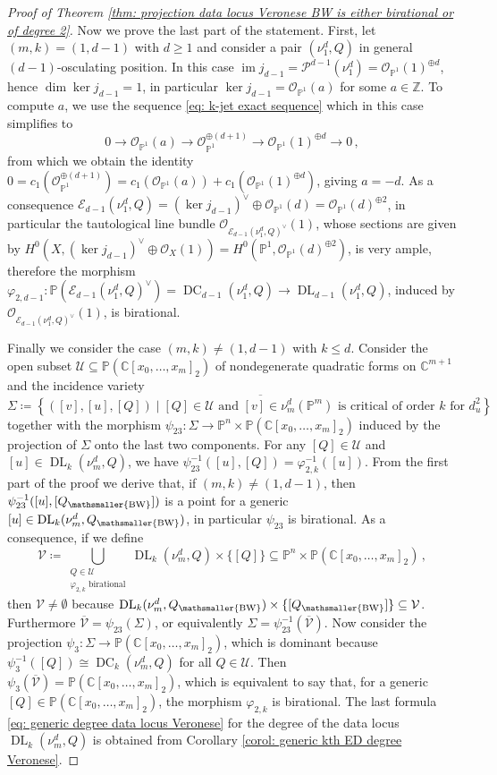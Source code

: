 \documentclass[11pt,reqno]{amsart}
\numberwithin{equation}{section}
\theoremstyle{plain}
\numberwithin{theorem}{section}
\theoremstyle{definition}
\renewcommand{\P}{\mathbb{P}}
\newcommand{\Z}{\mathbb{Z}}
\newcommand{\C}{\mathbb{C}}
\newcommand{\EE}{\mathcal{E}}
\newcommand{\OO}{\mathcal{O}}
\newcommand{\PP}{\mathcal{P}}
\newcommand{\DC}{\operatorname{DC}}
\newcommand{\DL}{\operatorname{DL}}
\newcommand{\image}{\operatorname{im}}
\newcommand{\mBW}{\mathsmaller{\mathrm{BW}}}
\begin{document}
\begin{proof}[Proof of Theorem \ref{thm: projection data locus Veronese BW is either birational or of degree 2}]
Now we prove the last part of the statement. First, let $(m,k)=(1,d-1)$ with $d\ge 1$ and consider a pair $(\nu_1^d,Q)$ in general $(d-1)$-osculating position. In this case $\image j_{d-1}=\PP^{d-1}(\nu_1^d)=\OO_{\P^1}(1)^{\oplus d}$, hence $\dim\ker j_{d-1}=1$, in particular $\ker j_{d-1}=\OO_{\P^1}(a)$ for some $a\in\Z$. To compute $a$, we use the sequence \eqref{eq: k-jet exact sequence} which in this case simplifies to
\[
0 \to \OO_{\P^1}(a) \to \OO_{\P^1}^{\oplus(d+1)} \to \OO_{\P^1}(1)^{\oplus d} \to 0\,,
\]
from which we obtain the identity $0=c_1(\OO_{\P^1}^{\oplus(d+1)})=c_1(\OO_{\P^1}(a))+c_1(\OO_{\P^1}(1)^{\oplus d})$, giving $a=-d$. As a consequence $\EE_{d-1}(\nu_1^d,Q)=(\ker j_{d-1})^\vee\oplus\OO_{\P^1}(d)=\OO_{\P^1}(d)^{\oplus 2}$, in particular the tautological line bundle $\OO_{\EE_{d-1}(\nu_1^d,Q)^\vee}(1)$, whose sections are given by $H^0(X,(\ker j_{d-1})^\vee\oplus \OO_X(1))=H^0(\P^1,\OO_{\P^1}(d)^{\oplus 2})$, is very ample, therefore the morphism $\varphi_{2,d-1}\colon\P(\EE_{d-1}(\nu_1^d,Q)^\vee)=\DC_{d-1}(\nu_1^d,Q)\to\DL_{d-1}(\nu_1^d,Q)$, induced by $\OO_{\EE_{d-1}(\nu_1^d,Q)^\vee}(1)$, is birational.

Finally we consider the case $(m,k)\neq(1,d-1)$ with $k\le d$. Consider the open subset $\mathcal{U}\subseteq\P(\C[x_0,\dots,x_m]_2)$ of nondegenerate quadratic forms on $\C^{m+1}$ and the incidence variety
\[
\Sigma \coloneqq \overline{\left\{([v],[u],[Q]) \mid \text{$[Q]\in\mathcal{U}$ and $[v]\in \nu_m^d(\P^m)$ is critical of order $k$ for $d_u^2$}\right\}}
\]
together with the morphism $\psi_{23}\colon\Sigma\to\P^n\times\P(\C[x_0,\dots,x_m]_2)$ induced by the projection of $\Sigma$ onto the last two components. For any $[Q]\in\mathcal{U}$ and $[u]\in\DL_k(\nu_m^d,Q)$, we have $\psi_{23}^{-1}([u],[Q])=\varphi_{2,k}^{-1}([u])$. From the first part of the proof we derive that, if $(m,k)\neq (1,d-1)$, then $\psi_{23}^{-1}([u],[Q_\mBW])$ is a point for a generic $[u]\in\DL_k(\nu_m^d,Q_\mBW)$, in particular $\psi_{23}$ is birational. As a consequence, if we define
\[
\mathcal{V}\coloneqq\bigcup_{\substack{Q\in\mathcal{U}\\\text{$\varphi_{2,k}$ birational}}}\DL_k(\nu_m^d,Q)\times\{[Q]\}\subseteq\P^n\times\P(\C[x_0,\dots,x_m]_2)\,,
\]
then $\mathcal{V}\neq\emptyset$ because $\DL_k(\nu_m^d,Q_\mBW)\times\{[Q_\mBW]\}\subseteq\mathcal{V}$. Furthermore $\overline{\mathcal{V}}=\psi_{23}(\Sigma)$, or equivalently $\Sigma=\psi_{23}^{-1}(\overline{\mathcal{V}})$. Now consider the projection $\psi_3\colon\Sigma\to\P(\C[x_0,\dots,x_m]_2)$, which is dominant because $\psi_3^{-1}([Q])\cong\DC_k(\nu_m^d,Q)$ for all $Q\in\mathcal{U}$. Then $\psi_3(\overline{\mathcal{V}})=\P(\C[x_0,\dots,x_m]_2)$, which is equivalent to say that, for a generic $[Q]\in\P(\C[x_0,\dots,x_m]_2)$, the morphism $\varphi_{2,k}$ is birational. The last formula \eqref{eq: generic degree data locus Veronese} for the degree of the data locus $\DL_k(\nu_m^d,Q)$ is obtained from Corollary \ref{corol: generic kth ED degree Veronese}.
\end{proof}
\end{document}

